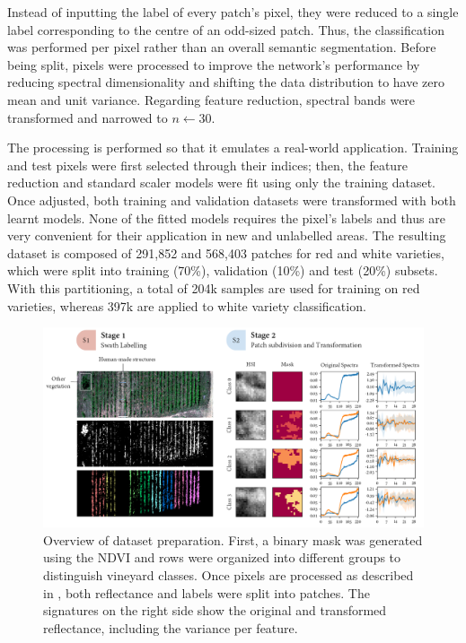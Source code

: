 Instead of inputting the label of every patch's pixel, they were reduced to a single label corresponding to the centre of an odd-sized patch. Thus, the classification was performed per pixel rather than an overall semantic segmentation. Before being split, pixels were processed to improve the network's performance by reducing spectral dimensionality and shifting the data distribution to have zero mean and unit variance. Regarding feature reduction, spectral bands were transformed and narrowed to $n \gets 30$.

The processing is performed so that it emulates a real-world application. Training and test pixels were first selected through their indices; then, the feature reduction and standard scaler models were fit using only the training dataset. Once adjusted, both training and validation datasets were transformed with both learnt models. None of the fitted models requires the pixel's labels and thus are very convenient for their application in new and unlabelled areas. The resulting dataset is composed of 291,852 and 568,403 patches for red and white varieties, which were split into training (70\%), validation (10\%) and test (20\%) subsets. With this partitioning, a total of 204k samples are used for training on red varieties, whereas 397k are applied to white variety classification.

\begin{figure}[ht]
    \centering
    \includegraphics[width=\linewidth]{figs/vineyard_classification/dataset.png}
	\caption{Overview of dataset preparation. First, a binary mask was generated using the NDVI and rows were organized into different groups to distinguish vineyard classes. Once pixels are processed as described in , both reflectance and labels were split into patches. The signatures on the right side show the original and transformed reflectance, including the variance per feature. }
	\label{fig:vineyard_dataset}
\end{figure}

